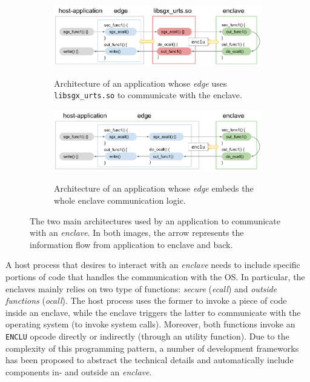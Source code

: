 \begin{figure}[t]
	\centering
	\begin{subfigure}[b]{0.9\linewidth}
		\centering
		\includegraphics[width=\textwidth]{fig_c7/sgxprogrammingpattern_library.pdf}
		\\[1em]
		\caption{Architecture of an application whose \emph{edge}
			uses \texttt{libsgx\_urts.so} to communicate with the enclave.}
		\label{fig:sgxprogrammingpattern_library}
	\end{subfigure}
	\hfill
	\begin{subfigure}[b]{0.9\linewidth}
		\centering
		\includegraphics[width=\textwidth]{fig_c7/sgxprogrammingpattern_static.pdf}
		\\[1em]
		\caption{Architecture of an application whose \emph{edge}
			embeds the whole enclave communication logic.}
		\label{fig:sgxprogrammingpattern_static}
	\end{subfigure}
	\caption[Development frameworks' architecture.]{The two main architectures 
	used by an application to communicate with an \emph{enclave}. In both 
	images, the arrow represents the information flow from application to 
	enclave and back.}
	\label{fig:sgxprogrammingpattern}
\end{figure}

A host process that desires to interact with an \emph{enclave} needs to
include specific portions of code that handles the communication with the OS.
In particular, the enclaves mainly relies on two type of functions: 
\emph{secure} (\emph{ecall}) and \emph{outside	functions} (\emph{ocall}). 
The host process uses the former to invoke a piece of code inside an enclave, 
while the enclave triggers the latter to communicate with the operating system 
(\eg to invoke system calls). 
Moreover, both functions invoke an \texttt{ENCLU} opcode directly or indirectly
(\ie through an utility function).
Due to the complexity of this programming pattern, a number
of development frameworks has been proposed to abstract the technical
details and automatically include components in- and outside an
\emph{enclave}.

